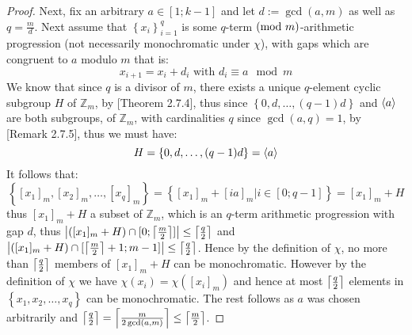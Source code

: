 \begin{proof}
	Next, fix an arbitrary $a \in [1; k - 1]$ and let $d := \gcd(a, m)$ as well as $q = \frac{m}{d}$.
	Next assume that $\left\{x_i\right\}_{i = 1}^q$ is some $q$-term $(\textnormal{mod } m)$-arithmetic progression (not necessarily monochromatic under $\chi$), with gaps which are congruent to $a$ modulo $m$ that is:
	\begin{equation*}
		x_{i + 1} = x_i + d_i \text{ with } d_i \equiv a \mod m
	\end{equation*}
	We know that since $q$ is a divisor of $m$, there exists a unique $q$-element cyclic subgroup $H$ of $\mathbb{Z}_{m}$, by \cite{alg_lauritzen}[Theorem 2.7.4], thus since $\left\{0, d, \ldots, (q - 1)d\right\}$ and $\langle a\rangle$ are both subgroups, of $\mathbb{Z}_m$, with cardinalities $q$ since $\gcd(a, q) = 1$, by \cite{alg_lauritzen}[Remark 2.7.5], thus we must have:
	\begin{equation*}
		H = \left\{0, d, \ldots, (q - 1)d\right\} = \langle a\rangle
	\end{equation*}
	It follows that:
	\begin{equation*}
		\left\{[x_1]_{m}, [x_2]_{m}, \ldots, [x_{q}]_{m}\right\} = \left\{[x_1]_{m} + [i a]_{m} | i \in [0; q - 1]\right\} = [x_1]_m + H
	\end{equation*}
	thus $[x_1]_m + H$ a subset of $\mathbb{Z}_{m}$, which is an $q$-term arithmetic progression with gap $d$, thus $\left\lvert([x_1]_m + H) \cap [0; \left\lceil\frac{m}{2}\right\rceil]\right\rvert \leq \left\lceil\frac{q}{2}\right\rceil$ and $\left\lvert([x_1]_m + H) \cap [\left\lceil\frac{m}{2}\right\rceil + 1; m - 1]\right\rvert \leq \left\lceil\frac{q}{2}\right\rceil$.
	Hence by the definition of $\chi$, no more than $\left\lceil\frac{q}{2}\right\rceil$ members of $[x_1]_m + H$ can be monochromatic.
	However by the definition of $\chi$ we have $\chi(x_i) = \chi([x_{i}]_{m})$ and hence at most $\left\lceil\frac{q}{2}\right\rceil$ elements in $\left\{x_1, x_2, \ldots, x_{q}\right\}$ can be monochromatic.
	The rest follows as $a$ was chosen arbitrarily and $\left\lceil\frac{q}{2}\right\rceil = \left\lceil\frac{m}{2\gcd(a, m)}\right\rceil \leq \left\lceil\frac{m}{2}\right\rceil$.
\end{proof}
